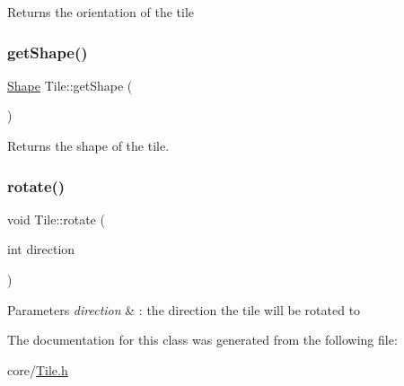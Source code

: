 \begin{DoxyReturn}{Returns}
the orientation of the tile 
\end{DoxyReturn}
\mbox{\label{classTile_a4eab532aa493c106b1847263f1aa1185}} 
\subsubsection{\texorpdfstring{getShape()}{getShape()}}
{\footnotesize\ttfamily \mbox{\hyperlink{Shape_8h_a55b506070847a13554f8b879c1bfb37c}{Shape}} Tile\+::get\+Shape (\begin{DoxyParamCaption}{ }\end{DoxyParamCaption})}

\begin{DoxyReturn}{Returns}
the shape of the tile. 
\end{DoxyReturn}
\mbox{\label{classTile_a100c31dd86bc6cdc67cf696f9ad391f1}} 
\subsubsection{\texorpdfstring{rotate()}{rotate()}}
{\footnotesize\ttfamily void Tile\+::rotate (\begin{DoxyParamCaption}\item[{int}]{direction }\end{DoxyParamCaption})}


\begin{DoxyParams}{Parameters}
{\em direction} & \+: the direction the tile will be rotated to \\
\hline
\end{DoxyParams}


The documentation for this class was generated from the following file\+:\begin{DoxyCompactItemize}
\item 
core/\mbox{\hyperlink{Tile_8h}{Tile.\+h}}\end{DoxyCompactItemize}
